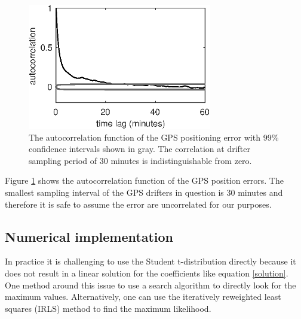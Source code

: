 \documentclass[10pt,journal]{IEEEtran}
\begin{document}
\begin{figure}
  \centerline{\includegraphics[width=19pc,angle=0]{figures/gps_autocorrelation}}
  \caption{The autocorrelation function of the GPS positioning error with 99\% confidence intervals shown in gray. The correlation at drifter sampling period of 30 minutes is indistinguishable from zero.}
  \label{gps_autocorrelation}
\end{figure}

Figure \ref{gps_autocorrelation} shows the autocorrelation function of the GPS position errors. The smallest sampling interval of the GPS drifters in question is 30 minutes and therefore it is safe to assume the error are uncorrelated for our purposes.

%
\subsection{Numerical implementation}
%

In practice it is challenging to use the Student t-distribution directly because it does not result in a linear solution for the coefficients like equation \ref{solution}. One method around this issue to use a search algorithm to directly look for the maximum values. Alternatively, one can use the iteratively reweighted least squares (IRLS) method to find the maximum likelihood.
\end{document}
